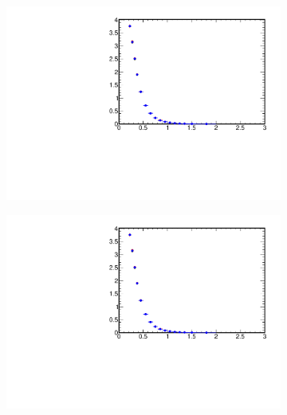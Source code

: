 \begin{figure}[h!]
	\centering
	\begin{subfigure}{.49\textwidth}
		\includegraphics[width=\textwidth,page=6]{chapters/chrgSTAR/img/syst/out_chargedmax.pdf}
	\end{subfigure}
	\begin{subfigure}{.49\textwidth}
		\includegraphics[width=\textwidth,page=13]{chapters/chrgSTAR/img/syst/out_chargedmax.pdf}
	\end{subfigure}
	\begin{subfigure}{.49\textwidth}

\end{subfigure}
\end{figure}
